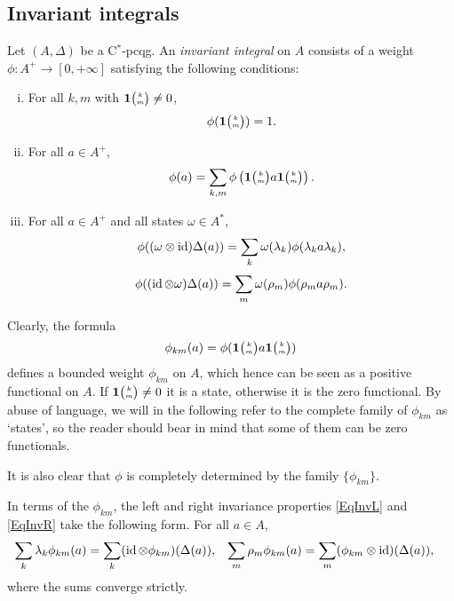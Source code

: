 \subsection{Invariant integrals}
\begin{Def} Let $(A,\Delta)$ be a C$^*$-pcqg. An \emph{invariant integral} on $A$ consists of a weight $\phi: A^+ \rightarrow [0,+\infty]$ satisfying the following conditions:
\begin{enumerate}[i)]
\item For all $k,m$ with $\mathbf{1}{\tiny {\begin{pmatrix} k\\m\end{pmatrix}}}\neq 0$, \[\phi(\mathbf{1}{\tiny {\begin{pmatrix} k\\m\end{pmatrix}}}) = 1.\]
\item For all $a\in A^+$, \[\phi(a) = \sum_{k,m} \phi\left(\mathbf{1}{\tiny {\begin{pmatrix} k\\m\end{pmatrix}}}a\mathbf{1}{\tiny {\begin{pmatrix} k\\m\end{pmatrix}}}\right).\]
\item For all $a\in A^+$ and all states $\omega\in A^*$, \begin{equation}\label{EqInvL} \phi((\omega \otimes \operatorname{id})\Delta(a)) = \sum_{k} \omega(\lambda_k)\phi(\lambda_ka\lambda_k),\end{equation} \begin{equation}\label{EqInvR} \phi((\operatorname{id}\otimes \omega)\Delta(a)) = \sum_{m}\omega(\rho_m)\phi(\rho_ma\rho_m).\end{equation}
\end{enumerate} 
\end{Def}





Clearly, the formula \[\phi_{km}(a) = \phi(\mathbf{1}{\tiny {\begin{pmatrix} k\\m\end{pmatrix}}}a\mathbf{1}{\tiny {\begin{pmatrix} k\\m\end{pmatrix}}})\] defines a bounded weight $\phi_{km}$ on $A$, which hence can be seen as a positive functional on $A$. If $\mathbf{1}{\tiny {\begin{pmatrix} k\\m\end{pmatrix}}}\neq 0$ it is a state, otherwise it is the zero functional. By abuse of language, we will in the following refer to the complete family of $\phi_{km}$ as `states', so the reader should bear in mind that some of them can be zero functionals.

It is also clear that $\phi$ is completely determined by the family
$\{\phi_{km}\}$.  

In terms of the $\phi_{km}$, the left and right invariance properties
\eqref{EqInvL} and \eqref{EqInvR} take the following form.  For all
$a\in A$,
\begin{align} \label{eq:invariance}
\sum_{k}  \lambda_{k} \phi_{km}(a) &= \sum_{k}  (\operatorname{id} \otimes
\phi_{km})(\Delta(a)), &
\sum_{m} \rho_{m} \phi_{km}(a) &= \sum_{m} (\phi_{km} \otimes \operatorname{id})(\Delta(a)),
\end{align}
where the sums converge strictly.

